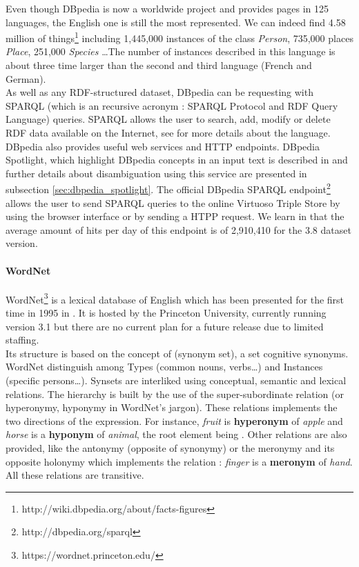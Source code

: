 Even though DBpedia is now a worldwide project and provides pages in 125 languages, the English one is still the most represented. We can indeed find 4.58 million of things\footnote{http://wiki.dbpedia.org/about/facts-figures} including 1,445,000 instances of the class \textit{Person}, 735,000 places \textit{Place}, 251,000 \textit{Species} \dots The number of instances described in this language is about three time larger than the second and third language (French and German). \\

As well as any RDF-structured dataset, DBpedia can be requesting with SPARQL (which is an recursive acronym : SPARQL Protocol and RDF Query Language) queries. SPARQL allows the user to search, add, modify or delete RDF data available on the Internet, see \cite{prud} for more details about the language. \\

DBpedia also provides useful web services and HTTP endpoints. DBpedia Spotlight, which highlight DBpedia concepts in an input text is described in \cite{mendes} and further details about disambiguation using this service are presented in subsection \ref{sec:dbpedia_spotlight}. The official DBpedia SPARQL endpoint\footnote{http://dbpedia.org/sparql} allows the user to send SPARQL queries to the online Virtuoso Triple Store by using the browser interface or by sending a HTPP request. We learn in \cite{lehman} that the average amount of hits per day of this endpoint is of 2,910,410 for the 3.8 dataset version. \\
\paragraph{WordNet} %
\label{par:wordnet}
WordNet\footnote{https://wordnet.princeton.edu/} is a lexical database of English which has been presented for the first time in 1995 in \cite{miller2}. It is hosted by the Princeton University, currently running version 3.1 but there are no current plan for a future release due to limited staffing.\\

Its structure is based on the concept of  (synonym set), a set cognitive synonyms. WordNet distinguish among Types (common nouns, verbs\dots) and Instances (specific persons\dots). Synsets are interliked using conceptual, semantic and lexical relations. The hierarchy is built by the use of the super-subordinate relation (or hyperonymy, hyponymy in WordNet's jargon). These relations implements the two directions of the  expression. For instance, \textit{fruit} is \textbf{hyperonym} of \textit{apple} and \textit{horse} is a \textbf{hyponym} of \textit{animal}, the root element being . Other relations are also provided, like the antonymy (opposite of synonymy) or the meronymy and its opposite holonymy which implements the  relation : \textit{finger} is a \textbf{meronym} of \textit{hand}. All these relations are transitive.\\

